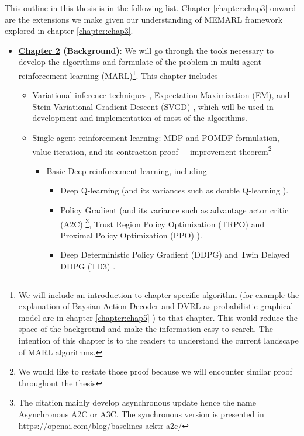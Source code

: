 \label{sec:chap1-Outline}
This outline in this thesis is in the following list. Chapter \ref{chapter:chap3} onward are the extensions we make given our understanding of MEMARL framework explored in chapter \ref{chapter:chap3}.
\begin{itemize}
    \item \textbf{\hyperref[chapter:chap2]{Chapter 2} (Background)}: We will go through the tools necessary to develop the algorithms and formulate of the problem in multi-agent reinforcement learning (MARL)\footnote{We will include an introduction to chapter specific algorithm (for example the explanation of Baysian Action Decoder \cite{foerster2018bayesian} and DVRL as probabilistic graphical model \cite{shvechikovjoint} are in chapter \ref{chapter:chap5} ) to that chapter. This would reduce the space of the background and make the information easy to search. The intention of this chapter is to the readers to understand the current landscape of MARL algorithms.}. This chapter includes 
    \begin{itemize}
        \item Variational inference techniques \cite{jordan1999introduction}, Expectation Maximization (EM), and Stein Variational Gradient Descent (SVGD) \cite{liu2016stein}, which will be used in development and implementation of most of the algorithms.
        \item Single agent reinforcement learning: MDP and POMDP formulation, value iteration, and its contraction proof + improvement theorem\footnote{We would like to restate those proof because we will encounter similar proof throughout the thesis}
        \begin{itemize}
            \item Basic Deep reinforcement learning, including
            \begin{itemize}
                \item  Deep Q-learning \cite{mnih2015human} (and its variances such as double Q-learning \cite{van2016deep}).
                \item Policy Gradient \cite{sutton2000policy} (and its variance such as advantage actor critic (A2C) \cite{mnih2016asynchronous}\footnote{The citation mainly develop asynchronous update hence the name Asynchronous A2C or A3C. The synchronous version is presented in \url{https://openai.com/blog/baselines-acktr-a2c/}}, Trust Region Policy Optimization (TRPO) \cite{schulman2015trust} and Proximal Policy Optimization (PPO) \cite{schulman2017proximal}).
                \item Deep Deterministic Policy Gradient (DDPG) \cite{lillicrap2015continuous} and Twin Delayed DDPG (TD3) \cite{fujimoto2018addressing}.

\end{itemize}
\end{itemize}
\end{itemize}
\end{itemize}
